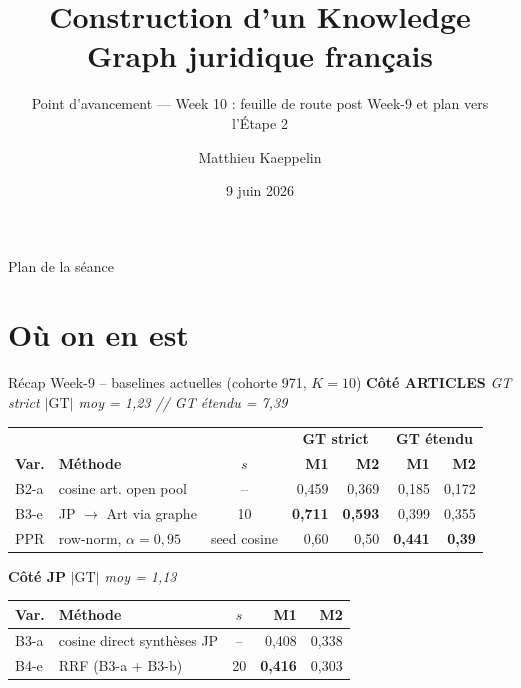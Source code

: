 \documentclass[aspectratio=169,10pt]{beamer}
\title[KG juridique FR --- Week 10]{Construction d'un Knowledge Graph juridique français}
\subtitle{Point d'avancement --- Week 10 : feuille de route post Week-9 et plan vers l'Étape 2}
\author{Matthieu Kaeppelin}
\institute{Stage FE Recherche}
\date{9 juin 2026}
\begin{document}
\begin{frame}
  \titlepage
\end{frame}

\begin{frame}{Plan de la séance}
  \tableofcontents[hideallsubsections]
\end{frame}

\section{Où on en est}

\begin{frame}{Récap Week-9 -- baselines actuelles (cohorte 971, $K{=}10$)}
  \scriptsize
  \textbf{Côté ARTICLES} \hfill \textit{GT strict $|\mathrm{GT}|$ moy = 1,23 \quad // \quad GT étendu = 7,39}

  \vspace{0.2em}
  \renewcommand{\arraystretch}{1.05}
  \setlength{\tabcolsep}{4pt}
  \begin{center}
  \begin{tabular}{@{}l l c | r r | r r@{}}
    \toprule
    & & & \multicolumn{2}{c|}{\textbf{GT strict}} & \multicolumn{2}{c}{\textbf{GT étendu}} \\
    \textbf{Var.} & \textbf{Méthode} & $s$
    & \textbf{M1} & \textbf{M2} & \textbf{M1} & \textbf{M2} \\
    \midrule
    B2-a & cosine art. open pool       & --     & 0,459 & 0,369 & 0,185 & 0,172 \\
    \rowcolor{accentsoft}
    B3-e & JP $\to$ Art via graphe     & 10     & \textbf{0,711} & \textbf{0,593} & 0,399 & 0,355 \\
    \rowcolor{green!8}
    PPR  & row-norm, $\alpha = 0{,}95$ & seed cosine & 0,60 & 0,50 & \textbf{0,441} & \textbf{0,39} \\
    \bottomrule
  \end{tabular}
  \end{center}

  \vspace{0.4em}
  \textbf{Côté JP} \hfill \textit{$|\mathrm{GT}|$ moy = 1,13}

  \vspace{0.2em}
  \begin{center}
  \begin{tabular}{@{}l l c | r r@{}}
    \toprule
    \textbf{Var.} & \textbf{Méthode} & $s$ & \textbf{M1} & \textbf{M2} \\
    \midrule
    B3-a & cosine direct synthèses JP   & --   & 0,408 & 0,338 \\
    \rowcolor{accentsoft}
    B4-e & RRF (B3-a + B3-b)            & 20   & \textbf{0,416} & 0,303 \\
    \bottomrule
  \end{tabular}
  \end{center}


\end{frame}
\end{document}
